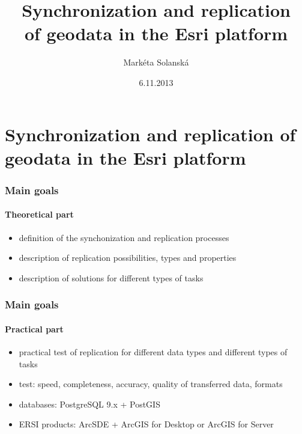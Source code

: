 \documentclass[xcolor=dvipsnames, 14pt]{beamer}
\title[Synchronization and replication of geodata]{Synchronization and replication \\ of geodata in the Esri platform}
\author[M. Solanská]{Markéta Solanská}
\date[6.11.2013]{6.11.2013}
\begin{document}

\begin{frame}
  \titlepage
\end{frame}



\section{Synchronization and replication of geodata in the Esri platform}

  \begin{frame}
    \frametitle{Main goals}
    \framesubtitle{Theoretical part}
    \begin{itemize}
      \item definition of the synchonization and replication processes
      \item description of replication possibilities, types and properties
      \item description of solutions for different types of tasks
    \end{itemize}
  \end{frame}

  \begin{frame}
    \frametitle{Main goals}
    \framesubtitle{Practical part}
    \begin{itemize}
      \item practical test of replication for different data types and different types of tasks
      \item test: speed, completeness, accuracy, quality of transferred data, formats
      \item databases: PostgreSQL 9.x + PostGIS
      \item ERSI products: ArcSDE + ArcGIS for Desktop or ArcGIS for Server
    \end{itemize}
  \end{frame}
\end{document}

